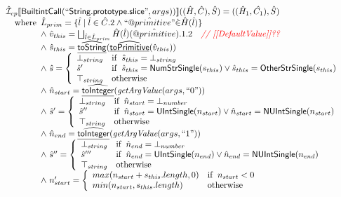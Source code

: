 \[\begin{array}{l}
\hat{\mathcal{I}} _{cp}\llbracket \mbox{\textsf{BuiltintCall}}(``\mbox{\textsf{String.prototype.slice}}",args))\rrbracket((\hat{H},\hat{C}), \hat{S})
  = ((\hat{H}_1, \hat{C_1}), \hat{S})\\
\quad{\rm where}\begin{array}[t]{l} 
  \hat{L}_{prim} = \{ \hat{l} \mid \hat{l} \in \hat{C}.2 \land ``\hat{@primitive}" \dot{\in}\hat{H}(\hat{l}) \}\\
  \land\ \hat{v}_{this} = \bigsqcup_{\hat{l} \in \hat{L}_{prim}} \hat{H}(\hat{l})(\hat{@primitive}).1.2
    \quad\textit{{\color{red}// [[DefaultValue]]??}}\\
  \land\ \hat{s}_{this} = \widehat{\underline{\sf toString}}(\widehat{\underline{\sf toPrimitive}}(\hat{v}_{this}))\\
  \land\ \hat{s} = \left\{\begin{array}{ll}
      \bot_{string} & {\rm if}\begin{array}[t]{l}\hat{s}_{this} = \bot_{string}\end{array}\\
      \hat{s}' & {\rm if}\begin{array}[t]{l}\hat{s}_{this} = \mbox{\textsf{NumStrSingle}}(s_{this}) \lor \hat{s}_{this} = \mbox{\textsf{OtherStrSingle}}(s_{this}) \end{array}\\
      \top_{string} & {\rm otherwise}
    \end{array}\right.\\
  \land\ \hat{n}_{start} = \widehat{\underline{\sf toInteger}}(\emph{getArgValue}(args, ``0"))\\  
  \land\ \hat{s}' = \left\{\begin{array}{ll}
      \bot_{string} & {\rm if}\begin{array}[t]{l}\hat{n}_{start} = \bot_{number}\end{array}\\
      \hat{s}'' & {\rm if}\begin{array}[t]{l}\hat{n}_{start} = \mbox{\textsf{UIntSingle}}(n_{start}) \lor \hat{n}_{start} = \mbox{\textsf{NUIntSingle}}(n_{start}) \end{array}\\
      \top_{string} & {\rm otherwise}
    \end{array}\right.\\
  \land\ \hat{n}_{end} = \widehat{\underline{\sf toInteger}}(\emph{getArgValue}(args, ``1"))\\  
  \land\ \hat{s}'' = \left\{\begin{array}{ll}
      \bot_{string} & {\rm if}\begin{array}[t]{l}\hat{n}_{end} = \bot_{number}\end{array}\\
      \hat{s}''' & {\rm if}\begin{array}[t]{l}\hat{n}_{end} = \mbox{\textsf{UIntSingle}}(n_{end}) \lor \hat{n}_{end} = \mbox{\textsf{NUIntSingle}}(n_{end}) \end{array}\\
      \top_{string} & {\rm otherwise}
    \end{array}\right.\\
  \land\ n_{start}'= \left\{\begin{array}{ll}
      max(n_{start} + s_{this}.length, 0) & {\rm if}\begin{array}[t]{l}n_{start} < 0\end{array}\\
      min(n_{start}, s_{this}.length) & {\rm otherwise}
    \end{array}\right.\\
\end{array}
\end{array}\]
